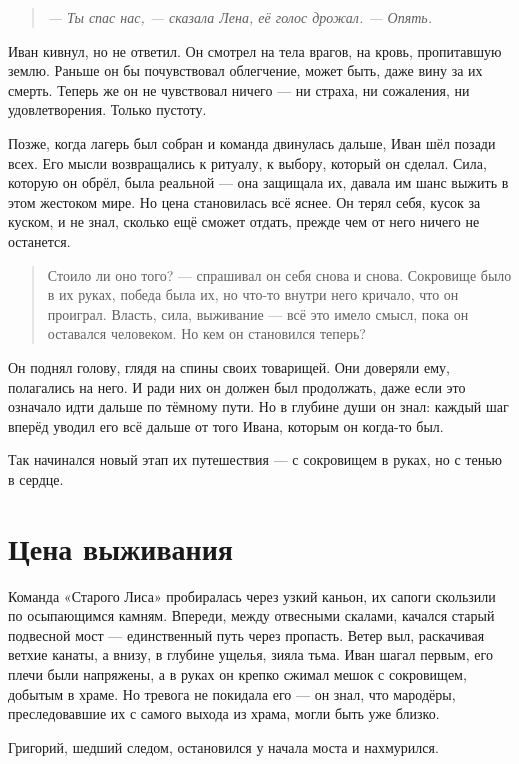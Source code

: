 \documentclass[12pt,a4paper]{book}
\newenvironment{dialogue}{\begin{quote}\itshape}{\end{quote}}
\begin{document}
\begin{dialogue}
--- Ты спас нас, --- сказала Лена, её голос дрожал. --- Опять.
\end{dialogue}

Иван кивнул, но не ответил. Он смотрел на тела врагов, на кровь, пропитавшую землю. Раньше он бы почувствовал облегчение, может быть, даже вину за их смерть. Теперь же он не чувствовал ничего --- ни страха, ни сожаления, ни удовлетворения. Только пустоту.

Позже, когда лагерь был собран и команда двинулась дальше, Иван шёл позади всех. Его мысли возвращались к ритуалу, к выбору, который он сделал. Сила, которую он обрёл, была реальной --- она защищала их, давала им шанс выжить в этом жестоком мире. Но цена становилась всё яснее. Он терял себя, кусок за куском, и не знал, сколько ещё сможет отдать, прежде чем от него ничего не останется.

\begin{quote}
Стоило ли оно того? --- спрашивал он себя снова и снова. Сокровище было в их руках, победа была их, но что-то внутри него кричало, что он проиграл. Власть, сила, выживание --- всё это имело смысл, пока он оставался человеком. Но кем он становился теперь?
\end{quote}

Он поднял голову, глядя на спины своих товарищей. Они доверяли ему, полагались на него. И ради них он должен был продолжать, даже если это означало идти дальше по тёмному пути. Но в глубине души он знал: каждый шаг вперёд уводил его всё дальше от того Ивана, которым он когда-то был.

Так начинался новый этап их путешествия --- с сокровищем в руках, но с тенью в сердце.

\chapter{Цена выживания}

Команда «Старого Лиса» пробиралась через узкий каньон, их сапоги скользили по осыпающимся камням. Впереди, между отвесными скалами, качался старый подвесной мост --- единственный путь через пропасть. Ветер выл, раскачивая ветхие канаты, а внизу, в глубине ущелья, зияла тьма. Иван шагал первым, его плечи были напряжены, а в руках он крепко сжимал мешок с сокровищем, добытым в храме. Но тревога не покидала его --- он знал, что мародёры, преследовавшие их с самого выхода из храма, могли быть уже близко.

Григорий, шедший следом, остановился у начала моста и нахмурился.
\end{document}

